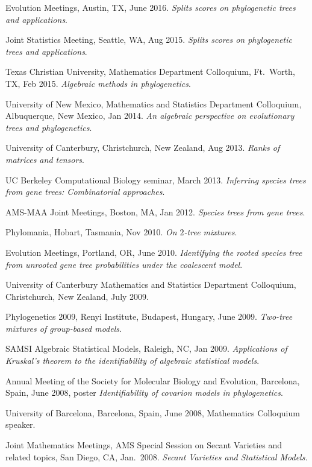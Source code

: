\documentclass[10pt]{report}
\begin{document}
{Evolution Meetings, Austin, TX, June 2016.
\emph{Splits scores on phylogenetic trees and applications}.

Joint Statistics Meeting, Seattle, WA, Aug 2015.
\emph{Splits scores on phylogenetic trees and applications}.

Texas Christian University, Mathematics Department Colloquium,
Ft.~Worth, TX, Feb 2015.
\emph{Algebraic methods in phylogenetics}.

University of New Mexico, Mathematics and Statistics Department Colloquium,
Albuquerque, New Mexico, Jan 2014.  
\emph{An algebraic perspective on evolutionary trees and phylogenetics}.

University of Canterbury, Christchurch, New Zealand, Aug 2013.
\emph{Ranks of matrices and tensors}.

UC Berkeley Computational Biology seminar, March 2013.
\emph{Inferring species trees from gene trees: Combinatorial approaches}.

AMS-MAA Joint Meetings, Boston, MA, Jan 2012. \emph{Species trees from gene trees}.


Phylomania, Hobart, Tasmania, Nov 2010. \emph{On $2$-tree mixtures}.

Evolution Meetings, Portland, OR, June 2010.
 \emph{Identifying the rooted species tree from unrooted gene tree probabilities
under the coalescent model}.

University of Canterbury Mathematics and Statistics Department Colloquium, Christchurch, 
New Zealand, July 2009.

Phylogenetics 2009, Renyi Institute, Budapest, Hungary, June 2009.
 \emph{Two-tree mixtures of group-based models}.

SAMSI Algebraic Statistical Models, Raleigh, NC, Jan 2009. 
\emph{Applications of Kruskal's theorem to the identifiability of algebraic statistical models}.

Annual Meeting of the Society for Molecular Biology and Evolution,
Barcelona, Spain, June 2008, poster \emph{Identifiability of covarion models
in phylogenetics}.

University of Barcelona, Barcelona, Spain, June 2008, Mathematics
Colloquium speaker.

Joint Mathematics Meetings, AMS Special Session on Secant Varieties
and related topics, San Diego, CA,  Jan.~2008. \emph{Secant Varieties and
Statistical Models.}

}
\end{document}
